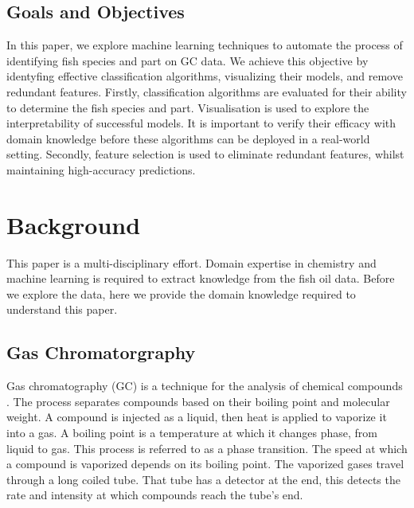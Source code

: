 \documentclass[runningheads]{llncs}
\begin{document}
\subsection{Goals and Objectives}

In this paper, we explore machine learning techniques to automate the process of identifying fish species and part on GC data. 
We achieve this objective by identyfing effective classification algorithms, visualizing their models, and remove redundant features. 
Firstly, classification algorithms are evaluated for their ability to determine the fish species and part. 
Visualisation is used to explore the interpretability of successful models.
It is important to verify their efficacy with domain knowledge before these algorithms can be deployed in a real-world setting.
Secondly, feature selection is used to eliminate redundant features, whilst maintaining high-accuracy predictions. 

\section{Background}

This paper is a multi-disciplinary effort.
Domain expertise in chemistry and machine learning is required to extract knowledge from the fish oil data. 
Before we explore the data, here we provide the domain knowledge required to understand this paper. 

\subsection{Gas Chromatorgraphy}

Gas chromatography (GC) is a technique for the analysis of chemical compounds \cite{eder1995gas,restek2018high,khan2013gas}.
The process separates compounds based on their boiling point and molecular weight.
A compound is injected as a liquid, then heat is applied to vaporize it into a gas. 
A boiling point is a temperature at which it changes phase, from liquid to gas. 
This process is referred to as a phase transition. 
The speed at which a compound is vaporized depends on its boiling point. 
The vaporized gases travel through a long coiled tube.
That tube has a detector at the end, this detects the rate and intensity at which compounds reach the tube's end. 
\end{document}

